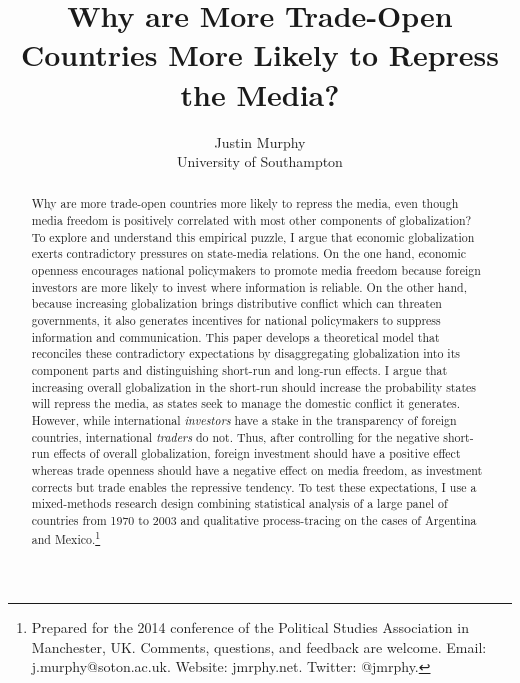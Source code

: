 \documentclass[12pt,a4paper]{article}\usepackage[]{graphicx}\usepackage[]{color}
\begin{document}
\title{Why are More Trade-Open Countries More Likely to Repress the Media?}

\author{Justin Murphy\\
University of Southampton}

\maketitle

\begin{singlespace}
\begin{abstract}
Why are more trade-open countries more likely to repress the media, even though media freedom is positively correlated with most other components of globalization? To explore and understand this empirical puzzle, I argue that economic globalization exerts contradictory pressures on state-media relations. On the one hand, economic openness encourages national policymakers to promote media freedom because foreign investors are more likely to invest where information is reliable. On the other hand, because increasing globalization brings distributive conflict which can threaten governments, it also generates incentives for national policymakers to suppress information and communication. This paper develops a theoretical model that reconciles these contradictory expectations by disaggregating globalization into its component parts and distinguishing short-run and long-run effects. I argue that increasing overall globalization in the short-run should increase the probability states will repress the media, as states seek to manage the domestic conflict it generates. However, while international \emph{investors} have a stake in the transparency of foreign countries, international \emph{traders} do not. Thus, after controlling for the negative short-run effects of overall globalization, foreign investment should have a positive effect whereas trade openness should have a negative effect on media freedom, as investment corrects but trade enables the repressive tendency. To test these expectations, I use a mixed-methods research design combining statistical analysis of a large panel of countries from 1970 to 2003 and qualitative process-tracing on the cases of Argentina and Mexico.\footnote{Prepared for the 2014 conference of the Political Studies Association in Manchester, UK. Comments, questions, and feedback are welcome. Email: j.murphy@soton.ac.uk. Website: jmrphy.net. Twitter: @jmrphy.}
\end{abstract}
\end{singlespace}
\end{document}
